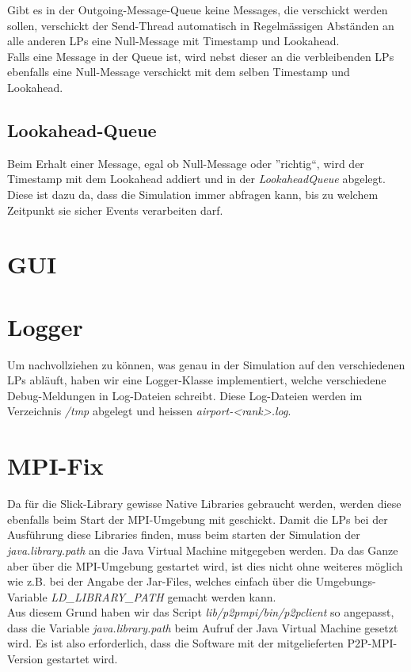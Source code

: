 \documentclass[oneside,DIV12,BCOR0.5cm,bibliography=totoc]{template}
\begin{document}
\begin{empfile}
Gibt es in der Outgoing-Message-Queue keine Messages, die verschickt
werden sollen, verschickt der Send-Thread automatisch in Regelmässigen
Abständen an alle anderen LPs eine Null-Message mit Timestamp und 
Lookahead.\\

Falls eine Message in der Queue ist, wird nebst dieser an die 
verbleibenden LPs ebenfalls eine Null-Message verschickt mit dem
selben Timestamp und Lookahead.

\subsection{Lookahead-Queue}

Beim Erhalt einer Message, egal ob Null-Message oder ''richtig``, 
wird der Timestamp mit dem Lookahead addiert und in der 
\emph{LookaheadQueue} abgelegt. Diese ist dazu da, dass die
Simulation immer abfragen kann, bis zu welchem Zeitpunkt sie sicher
Events verarbeiten darf.

\section{GUI}

\section{Logger}

Um nachvollziehen zu können, was genau in der Simulation auf den
verschiedenen LPs abläuft, haben wir eine Logger-Klasse implementiert,
welche verschiedene Debug-Meldungen in Log-Dateien schreibt. Diese
Log-Dateien werden im Verzeichnis \emph{/tmp} abgelegt und heissen
\emph{airport-<rank>.log}.

\section{MPI-Fix}

Da für die Slick-Library gewisse Native Libraries gebraucht werden,
werden diese ebenfalls beim Start der MPI-Umgebung mit geschickt. Damit
die LPs bei der Ausführung diese Libraries finden, muss beim starten
der Simulation der \emph{java.library.path} an die Java Virtual
Machine mitgegeben werden. Da das Ganze aber über die MPI-Umgebung
gestartet wird, ist dies nicht ohne weiteres möglich wie z.B. bei
der Angabe der Jar-Files, welches einfach über die Umgebungs-Variable
\emph{LD\_LIBRARY\_PATH} gemacht werden kann.\\

Aus diesem Grund haben wir das Script \emph{lib/p2pmpi/bin/p2pclient}
so angepasst, dass die Variable \emph{java.library.path} beim Aufruf
der Java Virtual Machine gesetzt wird. Es ist also erforderlich, dass
die Software mit der mitgelieferten P2P-MPI-Version gestartet wird.


\end{empfile}
\end{document}
